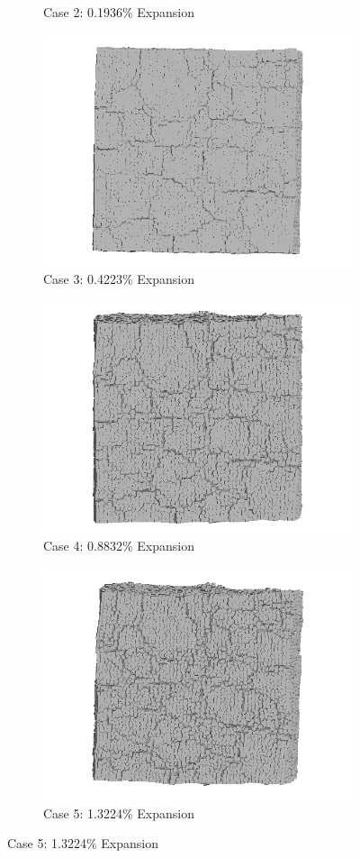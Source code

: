 \begin{figure}[!h]
\begin{subfigure}{.5\textwidth}
    \caption{Case 2: 0.1936\% Expansion}
    \end{subfigure}%
    \begin{subfigure}{.5\textwidth}
      \centering
      \includegraphics[width=.8\linewidth]{Files/exp_3D/ASR/A30P75_3_3ds.png}
    \caption{Case 3: 0.4223\% Expansion}
    \end{subfigure}
    \begin{subfigure}{.5\textwidth}
      \centering
      \includegraphics[width=.8\linewidth]{Files/exp_3D/ASR/A30P75_4_3ds.png}
    \caption{Case 4: 0.8832\% Expansion}
    \end{subfigure}%
    \begin{subfigure}{.5\textwidth}
      \centering
      \includegraphics[width=.8\linewidth]{Files/exp_3D/ASR/A30P75_5_3ds.png}
    \caption{Case 5: 1.3224\% Expansion}
    \end{subfigure}


\end{figure}
